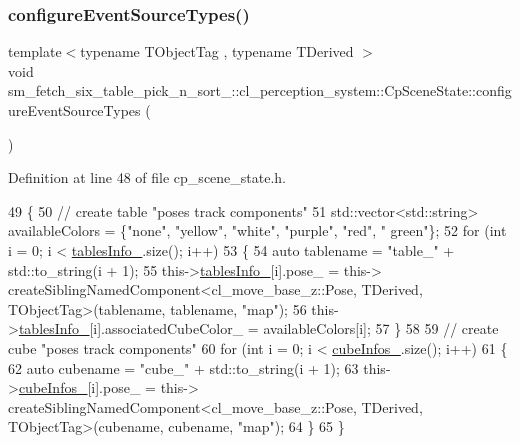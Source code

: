 \subsubsection{\texorpdfstring{configure\+Event\+Source\+Types()}{configureEventSourceTypes()}}
{\footnotesize\ttfamily template$<$typename T\+Object\+Tag , typename T\+Derived $>$ \\
void sm\+\_\+fetch\+\_\+six\+\_\+table\+\_\+pick\+\_\+n\+\_\+sort\+\_\+::cl\+\_\+perception\+\_\+system\+::\+Cp\+Scene\+State\+::configure\+Event\+Source\+Types (\begin{DoxyParamCaption}{ }\end{DoxyParamCaption})\hspace{0.3cm}{\ttfamily [inline]}}



Definition at line 48 of file cp\+\_\+scene\+\_\+state.\+h.


\begin{DoxyCode}
49             \{
50                 \textcolor{comment}{// create table "poses track components"}
51                 std::vector<std::string> availableColors = \{\textcolor{stringliteral}{"none"}, \textcolor{stringliteral}{"yellow"}, \textcolor{stringliteral}{"white"}, \textcolor{stringliteral}{"purple"}, \textcolor{stringliteral}{"red"}, \textcolor{stringliteral}{"
      green"}\};
52                 \textcolor{keywordflow}{for} (\textcolor{keywordtype}{int} i = 0; i < \hyperlink{classsm__fetch__six__table__pick__n__sort__1_1_1cl__perception__system_1_1CpSceneState_a2de6a25cdfe869099984fbf8225874cd}{tablesInfo\_}.size(); i++)
53                 \{
54                     \textcolor{keyword}{auto} tablename = \textcolor{stringliteral}{"table\_"} + std::to\_string(i + 1);
55                     this->\hyperlink{classsm__fetch__six__table__pick__n__sort__1_1_1cl__perception__system_1_1CpSceneState_a2de6a25cdfe869099984fbf8225874cd}{tablesInfo\_}[i].pose\_ = this->
      createSiblingNamedComponent<cl\_move\_base\_z::Pose, TDerived, TObjectTag>(tablename, tablename, \textcolor{stringliteral}{"map"});
56                     this->\hyperlink{classsm__fetch__six__table__pick__n__sort__1_1_1cl__perception__system_1_1CpSceneState_a2de6a25cdfe869099984fbf8225874cd}{tablesInfo\_}[i].associatedCubeColor\_ = availableColors[i];
57                 \}
58 
59                 \textcolor{comment}{// create cube "poses track components"}
60                 \textcolor{keywordflow}{for} (\textcolor{keywordtype}{int} i = 0; i < \hyperlink{classsm__fetch__six__table__pick__n__sort__1_1_1cl__perception__system_1_1CpSceneState_a9e412e0e18779e1fe371b0160919bd9b}{cubeInfos\_}.size(); i++)
61                 \{
62                     \textcolor{keyword}{auto} cubename = \textcolor{stringliteral}{"cube\_"} + std::to\_string(i + 1);
63                     this->\hyperlink{classsm__fetch__six__table__pick__n__sort__1_1_1cl__perception__system_1_1CpSceneState_a9e412e0e18779e1fe371b0160919bd9b}{cubeInfos\_}[i].pose\_ = this->
      createSiblingNamedComponent<cl\_move\_base\_z::Pose, TDerived, TObjectTag>(cubename, cubename, \textcolor{stringliteral}{"map"});
64                 \}
65             \}
\end{DoxyCode}


